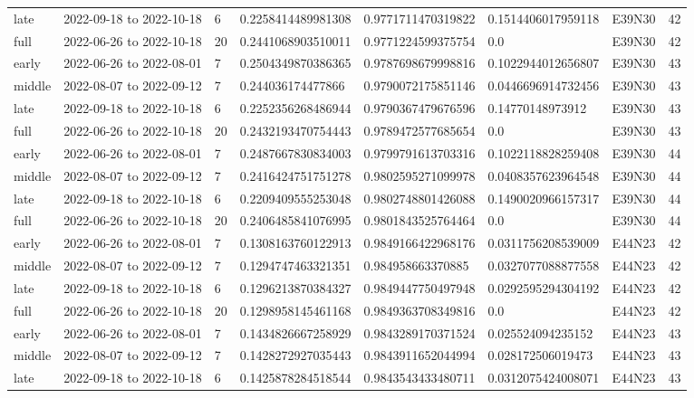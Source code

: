 \begin{longtable}{llllllll}
late & 2022-09-18 to 2022-10-18 & 6 & 0.2258414489981308 & 0.9771711470319822 & 0.1514406017959118 & E39N30 & 42 \\
full & 2022-06-26 to 2022-10-18 & 20 & 0.2441068903510011 & 0.9771224599375754 & 0.0 & E39N30 & 42 \\
early & 2022-06-26 to 2022-08-01 & 7 & 0.2504349870386365 & 0.9787698679998816 & 0.1022944012656807 & E39N30 & 43 \\
middle & 2022-08-07 to 2022-09-12 & 7 & 0.244036174477866 & 0.9790072175851146 & 0.0446696914732456 & E39N30 & 43 \\
late & 2022-09-18 to 2022-10-18 & 6 & 0.2252356268486944 & 0.9790367479676596 & 0.14770148973912 & E39N30 & 43 \\
full & 2022-06-26 to 2022-10-18 & 20 & 0.2432193470754443 & 0.9789472577685654 & 0.0 & E39N30 & 43 \\
early & 2022-06-26 to 2022-08-01 & 7 & 0.2487667830834003 & 0.9799791613703316 & 0.1022118828259408 & E39N30 & 44 \\
middle & 2022-08-07 to 2022-09-12 & 7 & 0.2416424751751278 & 0.9802595271099978 & 0.0408357623964548 & E39N30 & 44 \\
late & 2022-09-18 to 2022-10-18 & 6 & 0.2209409555253048 & 0.9802748801426088 & 0.1490020966157317 & E39N30 & 44 \\
full & 2022-06-26 to 2022-10-18 & 20 & 0.2406485841076995 & 0.9801843525764464 & 0.0 & E39N30 & 44 \\
early & 2022-06-26 to 2022-08-01 & 7 & 0.1308163760122913 & 0.9849166422968176 & 0.0311756208539009 & E44N23 & 42 \\
middle & 2022-08-07 to 2022-09-12 & 7 & 0.1294747463321351 & 0.984958663370885 & 0.0327077088877558 & E44N23 & 42 \\
late & 2022-09-18 to 2022-10-18 & 6 & 0.1296213870384327 & 0.9849447750497948 & 0.0292595294304192 & E44N23 & 42 \\
full & 2022-06-26 to 2022-10-18 & 20 & 0.1298958145461168 & 0.9849363708349816 & 0.0 & E44N23 & 42 \\
early & 2022-06-26 to 2022-08-01 & 7 & 0.1434826667258929 & 0.9843289170371524 & 0.025524094235152 & E44N23 & 43 \\
middle & 2022-08-07 to 2022-09-12 & 7 & 0.1428272927035443 & 0.9843911652044994 & 0.028172506019473 & E44N23 & 43 \\
late & 2022-09-18 to 2022-10-18 & 6 & 0.1425878284518544 & 0.9843543433480711 & 0.0312075424008071 & E44N23 & 43 \\

\end{longtable}

